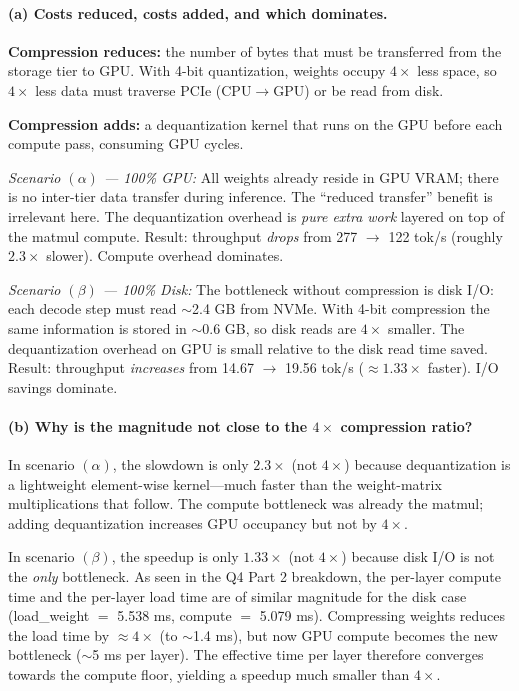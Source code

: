 \documentclass[12pt,a4paper]{article}
\begin{document}
\paragraph{(a) Costs reduced, costs added, and which dominates.}

\textbf{Compression reduces:} the number of bytes that must be transferred from the storage tier to GPU.
With 4-bit quantization, weights occupy $4\times$ less space, so $4\times$ less data must traverse PCIe (CPU$\to$GPU) or be read from disk.

\textbf{Compression adds:} a dequantization kernel that runs on the GPU before each compute pass, consuming GPU cycles.

\textit{Scenario $(\alpha)$ --- 100\% GPU:}
All weights already reside in GPU VRAM; there is no inter-tier data transfer during inference.
The ``reduced transfer'' benefit is irrelevant here.
The dequantization overhead is \emph{pure extra work} layered on top of the matmul compute.
Result: throughput \emph{drops} from 277 $\to$ 122 tok/s (roughly $2.3\times$ slower).
Compute overhead dominates.

\textit{Scenario $(\beta)$ --- 100\% Disk:}
The bottleneck without compression is disk I/O: each decode step must read $\sim$2.4 GB from NVMe.
With 4-bit compression the same information is stored in $\sim$0.6 GB, so disk reads are $4\times$ smaller.
The dequantization overhead on GPU is small relative to the disk read time saved.
Result: throughput \emph{increases} from 14.67 $\to$ 19.56 tok/s ($\approx 1.33\times$ faster).
I/O savings dominate.

\paragraph{(b) Why is the magnitude not close to the $4\times$ compression ratio?}

In scenario $(\alpha)$, the slowdown is only $2.3\times$ (not $4\times$) because dequantization is a lightweight element-wise kernel---much faster than the weight-matrix multiplications that follow.
The compute bottleneck was already the matmul; adding dequantization increases GPU occupancy but not by $4\times$.

In scenario $(\beta)$, the speedup is only $1.33\times$ (not $4\times$) because disk I/O is not the \emph{only} bottleneck.
As seen in the Q4 Part 2 breakdown, the per-layer compute time and the per-layer load time are of similar magnitude for the disk case (load\_weight $=$ 5.538 ms, compute $=$ 5.079 ms).
Compressing weights reduces the load time by $\approx 4\times$ (to $\sim$1.4 ms), but now GPU compute becomes the new bottleneck ($\sim$5 ms per layer).
The effective time per layer therefore converges towards the compute floor, yielding a speedup much smaller than $4\times$.
\end{document}
